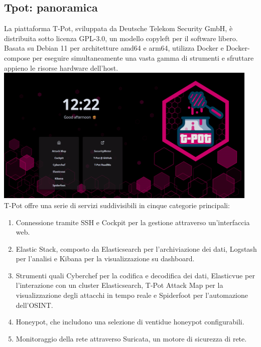 \subsection{Tpot: panoramica}
La piattaforma T-Pot, sviluppata da Deutsche Telekom Security GmbH, è distribuita sotto licenza GPL-3.0, un modello copyleft per il software libero. Basata su Debian 11 per architetture amd64 e arm64, utilizza Docker e Docker-compose per eseguire simultaneamente una vasta gamma di strumenti e sfruttare appieno le risorse hardware dell'host. \\
\includegraphics[width=0.95\textwidth]{image/tpot.png}\\
T-Pot offre una serie di servizi suddivisibili in cinque categorie principali:
\begin{enumerate}
	\item Connessione tramite SSH e Cockpit per la gestione attraverso un'interfaccia web. 
	\item Elastic Stack, composto da Elasticsearch per l'archiviazione dei dati, Logstash per l'analisi e Kibana per la visualizzazione su dashboard.
	\item Strumenti quali Cyberchef per la codifica e decodifica dei dati, Elasticvue per l'interazione con un cluster Elasticsearch, T-Pot Attack Map per la visualizzazione degli attacchi in tempo reale e Spiderfoot per l'automazione dell'OSINT.
	\item Honeypot, che includono una selezione di ventidue honeypot configurabili.
	\item Monitoraggio della rete attraverso Suricata, un motore di sicurezza di rete.
\end{enumerate}

